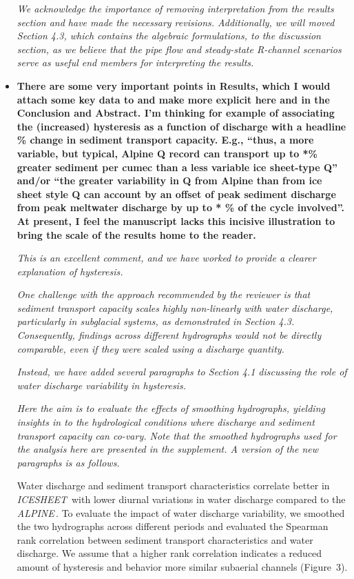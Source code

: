 \documentclass[11pt]{article}
\newcommand{\alpine}{\textit{ALPINE}\,}
\newcommand{\icesheet}{\textit{ICESHEET}\,}
\begin{document}
\begin{itemize}
\textit{We acknowledge the importance of removing interpretation from the results section and have made the necessary revisions. Additionally, we will moved Section 4.3, which contains the algebraic formulations, to the discussion section, as we believe that the pipe flow and steady-state R-channel scenarios serve as useful end members for interpreting the results.
}


  
\item \textbf{There are some very important points in Results, which I would attach some key data to
    and make more explicit here and in the Conclusion and Abstract. I’m thinking for example of
    associating the (increased) hysteresis as a function of discharge with a headline \% change in
    sediment transport capacity. E.g., “thus, a more variable, but typical, Alpine Q record can
    transport up to *\% greater sediment per cumec than a less variable ice sheet-type Q” and/or “the
    greater variability in Q from Alpine than from ice sheet style Q can account by an offset of peak
    sediment discharge from peak meltwater discharge by up to * \% of the cycle involved”. At present,
    I feel the manuscript lacks this incisive illustration to bring the scale of the results home to the
    reader.}

  \textit{This is an excellent comment, and we have worked to provide a clearer explanation of hysteresis.}

\textit{One challenge with the approach recommended by the reviewer is that sediment transport capacity scales highly non-linearly with water discharge, particularly in subglacial systems, as demonstrated in Section 4.3. Consequently, findings across different hydrographs would not be directly comparable, even if they were scaled using a discharge quantity.}

\textit{Instead, we have added several paragraphs to Section 4.1 discussing the role of water discharge variability in hysteresis.}

  \textit{Here the aim is to evaluate the effects of smoothing hydrographs, yielding insights in to the hydrological conditions where discharge and sediment transport capacity can co-vary.
    Note that the smoothed hydrographs used for the analysis here are presented in the supplement. 
    A version of the new paragraphs is as follows.}

  
Water discharge and sediment transport characteristics correlate better in \icesheet{} with lower diurnal variations in water discharge compared to the \alpine{}.
To evaluate the impact of water discharge variability, we smoothed the two hydrographs across different periods and evaluated the Spearman rank correlation between sediment transport characteristics and water discharge.
We assume that a higher rank correlation indicates a reduced amount of hysteresis and behavior more similar subaerial channels (Figure~3).


\end{itemize}
\end{document}
